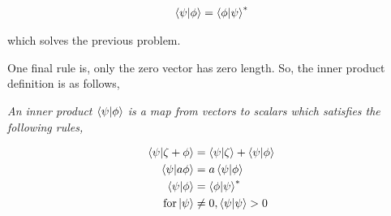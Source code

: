 	\begin{align*}
		\left\langle \psi \vert \phi \right\rangle = \left\langle \phi \vert \psi \right\rangle^*
	\end{align*}

	\noindent which solves the previous problem.

	\vspace{0.5cm}

	\noindent One final rule is, only the zero vector has zero length. So, the inner product
	definition is as follows,

	\begin{center}
		\emph{An inner product $ \left\langle \psi \vert \phi \right\rangle $ is a map from vectors
		to scalars which satisfies the following rules,}
	\end{center}

	\begin{align*}
	\begin{split}
		\left\langle \psi \vert \zeta + \phi \right\rangle &= \left\langle \psi \vert \zeta \right\rangle + \left\langle \psi \vert \phi \right\rangle \\
		\left\langle \psi \vert a \phi \right\rangle &= a \left\langle \psi \vert \phi \right\rangle \\
		\left\langle \psi \vert \phi \right\rangle &= \left\langle \phi \vert \psi \right\rangle^* \\
		\text{for} \ket{\psi} &\neq 0, \left\langle \psi \vert \psi \right\rangle > 0 \\
	\end{split}
	\end{align*}


